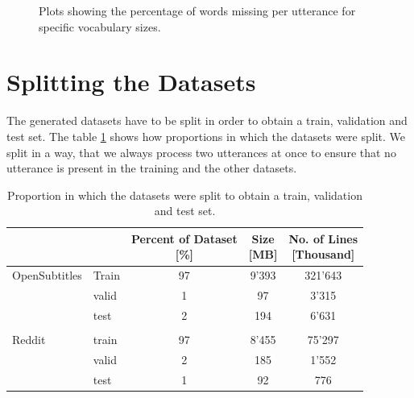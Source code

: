 \begin{figure}[H]
	\centering
	\small
	\endminipage
	\caption{Plots showing the percentage of words missing per utterance for specific vocabulary sizes.}
	\label{fig:data:reddit:vocab:analyze}
\end{figure}

\section{Splitting the Datasets}
The generated datasets have to be split in order to obtain a train, validation and test set. The table \ref{tbl:data:split:corpus} shows how proportions in which the datasets were split. We split in a way, that we always process two utterances at once to ensure that no utterance is present in the training and the other datasets.
\\
\begin{table}[H]
	\centering
	\begin{adjustbox}{max width=\textwidth}
		\centering
		\small
		\begin{tabular}{llccc}
			\toprule
			&  \specialcell{Set}
			&  \specialcell{Percent of Dataset \\ {[\%]}}
			&  \specialcell{Size \\{[MB]}}
			&  \specialcell{No. of Lines \\{[Thousand]}}\\
			\midrule
			OpenSubtitles	& Train	&97	&9'393	&321'643	\\
			&valid	&1	&97		&3'315	\\
			&test	&2	&194	&6'631	\\\\
			Reddit			&train	&97	&8'455	&75'297	\\
			&valid	&2	&185	&1'552	\\
			&test	&1	&92		&776	\\
			\bottomrule
		\end{tabular}
	\end{adjustbox}
	\caption{Proportion in which the datasets were split to obtain a train, validation and test set.}
	\label{tbl:data:split:corpus}
\end{table}

